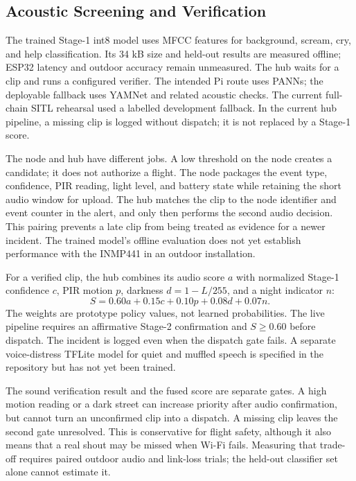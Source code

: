 \documentclass[conference]{IEEEtran}
\begin{document}
\subsection{Acoustic Screening and Verification}
\label{sec:acoustic}
The trained Stage-1 int8 model uses MFCC features for background, scream, cry, and help classification. Its 34 kB size and held-out results are measured offline; ESP32 latency and outdoor accuracy remain unmeasured. The hub waits for a clip and runs a configured verifier. The intended Pi route uses PANNs; the deployable fallback uses YAMNet and related acoustic checks. The current full-chain SITL rehearsal used a labelled development fallback. In the current hub pipeline, a missing clip is logged without dispatch; it is not replaced by a Stage-1 score.

The node and hub have different jobs. A low threshold on the node creates a candidate; it does not authorize a flight. The node packages the event type, confidence, PIR reading, light level, and battery state while retaining the short audio window for upload. The hub matches the clip to the node identifier and event counter in the alert, and only then performs the second audio decision. This pairing prevents a late clip from being treated as evidence for a newer incident. The trained model's offline evaluation does not yet establish performance with the INMP441 in an outdoor installation.

For a verified clip, the hub combines its audio score $a$ with normalized Stage-1 confidence $c$, PIR motion $p$, darkness $d=1-L/255$, and a night indicator $n$:
\begin{equation}
\label{eq:fusion}
S=0.60a+0.15c+0.10p+0.08d+0.07n.
\end{equation}
The weights are prototype policy values, not learned probabilities. The live pipeline requires an affirmative Stage-2 confirmation and $S\geq0.60$ before dispatch. The incident is logged even when the dispatch gate fails. A separate voice-distress TFLite model for quiet and muffled speech is specified in the repository but has not yet been trained.

The sound verification result and the fused score are separate gates. A high motion reading or a dark street can increase priority after audio confirmation, but cannot turn an unconfirmed clip into a dispatch. A missing clip leaves the second gate unresolved. This is conservative for flight safety, although it also means that a real shout may be missed when Wi-Fi fails. Measuring that trade-off requires paired outdoor audio and link-loss trials; the held-out classifier set alone cannot estimate it.
\end{document}
